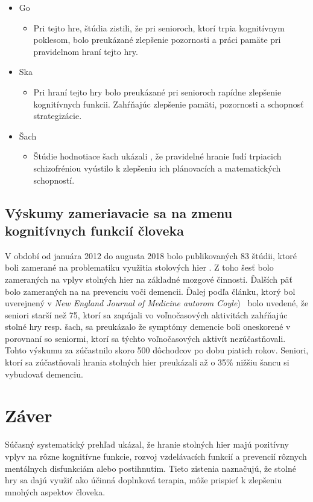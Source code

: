 \documentclass[10pt,oneside,slovak,a4paper]{article}
\begin{document}
\begin{itemize}
    \item Go
    	\begin{itemize}
        	\item {Pri tejto hre, štúdia \cite{Aydin:2015} zistili, že pri senioroch, ktorí trpia kognitívnym poklesom, bolo preukázané zlepšenie pozornosti a práci pamäte pri pravidelnom hraní tejto hry.}
    	\end{itemize}
    \item Ska
        \begin{itemize}
        	\item{Pri hraní tejto hry bolo preukázané \cite{Panphunpho:2013} pri senioroch rapídne zlepšenie kognitívnych funkcii. Zahŕňajúc zlepšenie pamäti, pozornosti a schopnosť strategizácie.}
    	\end{itemize}
    \item Šach
        \begin{itemize}
        	\item{Štúdie hodnotiace šach ukázali \cite{Sala:2015, Demily:2009}, že pravidelné hranie ľudí trpiacich schizofréniou vyústilo k zlepšeniu ich plánovacích a matematických schopností.}
    	\end{itemize}
\end{itemize}

\subsection{Výskumy zameriavacie sa na zmenu kognitívnych funkcií človeka}
    V období od januára 2012 do augusta 2018 bolo publikovaných 83 štúdii, ktoré boli zamerané na problematiku využitia stolových hier \cite{Nakao:BG}.
    Z toho šesť bolo zameraných na vplyv stolných hier na základné mozgové činnosti.
    Ďalších päť bolo zameraných na na prevenciu voči demencii.
    Ďalej podľa článku, ktorý bol uverejnený v \emph{New England Journal of Medicine autorom Coyle})~\cite{doi:10.1056/NEJMp030051} bolo uvedené, že seniori starší než 75, ktorí sa zapájali vo voľnočasových aktivitách zahŕňajúc stolné hry resp. šach, sa preukázalo že symptómy demencie boli oneskorené v porovnaní so seniormi, ktorí sa týchto voľnočasových aktivít nezúčastňovali. Tohto výskumu za zúčastnilo skoro 500 dôchodcov po dobu piatich rokov. Seniori, ktorí sa zúčastňovali hrania stolných hier preukázali až o 35\% nižšiu šancu si vybudovať demenciu.

\section{Záver} \label{zaver} %
Súčasný systematický prehľad ukázal, že hranie stolných hier majú pozitívny vplyv na rôzne kognitívne funkcie, rozvoj vzdelávacích funkcií a prevencií rôznych mentálnych disfunkciám alebo postihnutím. Tieto zistenia naznačujú, že stolné hry sa dajú využiť ako účinná doplnková terapia, môže prispieť k zlepšeniu mnohých aspektov človeka.






\end{document}
